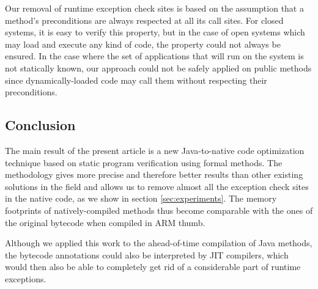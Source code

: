 Our removal of runtime exception check sites is based on the assumption that a method's preconditions are always respected at all its call sites. For closed systems, it is easy to verify this property, but in the case of open systems which may load and execute any kind of code, the property could not always be ensured. In the case where the set of applications that will run on the system is not statically known, our approach could not be safely applied on public methods since dynamically-loaded code may call them without respecting their preconditions.

\subsection{Conclusion}
\label{sec:conclusion}
The main result of the present article is a new Java-to-native code optimization technique based on static program verification using formal methods. The methodology gives more precise and therefore better results than other existing solutions in the field and allows us to remove almost all the exception check sites in the native code, as we show in section \ref{sec:experiments}. The memory footprints of natively-compiled methods thus become comparable with the ones of the original bytecode when compiled in ARM thumb.

Although we applied this work to the ahead-of-time compilation of Java methods, the bytecode annotations could also be interpreted by JIT compilers, which would then also be able to completely get rid of a considerable part of runtime exceptions.

